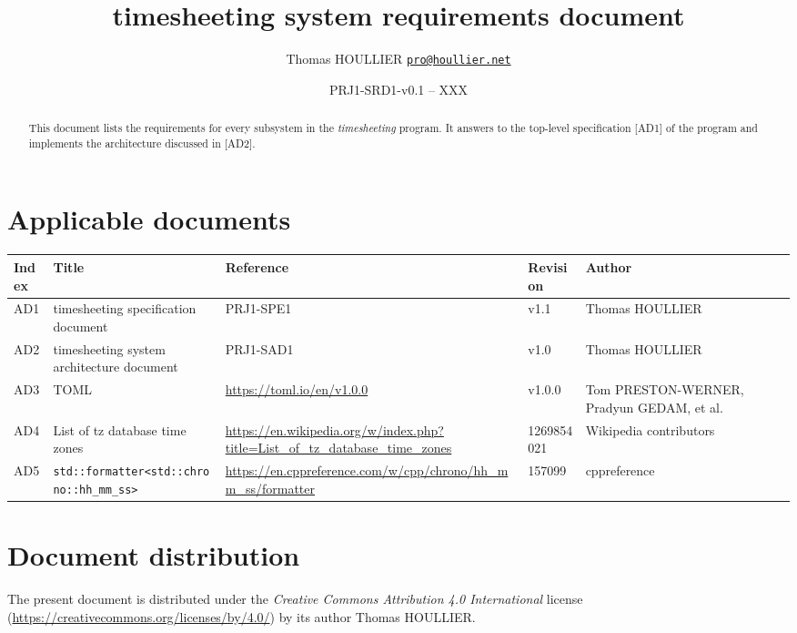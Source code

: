 \documentclass[letterpaper]{article}
\title{timesheeting system requirements document}
\author{Thomas HOULLIER \href{mailto:pro@houllier.net}
         {\texttt{\textlangle pro@houllier.net\textrangle}}}
\begin{document}
\frenchspacing
\date{PRJ1-SRD1-v0.1 -- XXX}
\maketitle
\thispagestyle{FirstPage}

\begin{abstract}
  This document lists the requirements for every subsystem in the
  \emph{timesheeting} program.
  It answers to the top-level specification [AD1] of the program and implements
  the architecture discussed in [AD2].
\end{abstract}

\begin{versionhistory}
\end{versionhistory}
\setcounter{table}{0} %

\section*{Applicable documents}
{ \centering
\begin{tabularx}{\textwidth}{| X | X | X | X | X |} \hline
  Index & Title & Reference & Revision & Author \\ \hline
  AD1   & timesheeting specification document & PRJ1-SPE1 & v1.1 & Thomas
  HOULLIER \\ \hline
  AD2   & timesheeting system architecture document & PRJ1-SAD1 & v1.0 & Thomas
  HOULLIER \\ \hline
  AD3   & TOML & \url{https://toml.io/en/v1.0.0} & v1.0.0 & Tom PRESTON-WERNER,
                                                            Pradyun GEDAM, et
                                                            al. \\ \hline
  AD4   & List of tz database time zones
        & \url{https://en.wikipedia.org/w/index.php?title=List_of_tz_database_time_zones}
                            & 1269854021 & Wikipedia contributors \\ \hline
  AD5   & \lstinline{std::formatter<std::chrono::hh_mm_ss>}
        & \url{https://en.cppreference.com/w/cpp/chrono/hh_mm_ss/formatter}
        & 157099 & cppreference \\
  \hline \end{tabularx} \par }

\section*{Document distribution}
The present document is distributed under the \emph{Creative Commons Attribution
4.0 International} license (\url{https://creativecommons.org/licenses/by/4.0/})
by its author Thomas HOULLIER.
\end{document}
